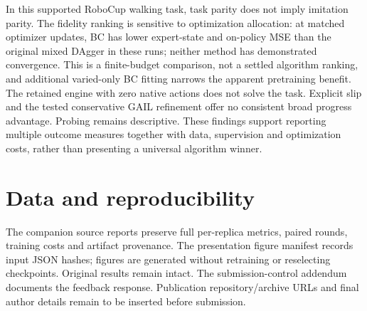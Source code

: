 \documentclass[conference]{IEEEtran}
\begin{document}
In this supported RoboCup walking task, task parity does not imply imitation parity. The fidelity ranking is sensitive to optimization allocation: at matched optimizer updates, BC has lower expert-state and on-policy MSE than the original mixed DAgger in these runs; neither method has demonstrated convergence. This is a finite-budget comparison, not a settled algorithm ranking, and additional varied-only BC fitting narrows the apparent pretraining benefit. The retained engine with zero native actions does not solve the task. Explicit slip and the tested conservative GAIL refinement offer no consistent broad progress advantage. Probing remains descriptive. These findings support reporting multiple outcome measures together with data, supervision and optimization costs, rather than presenting a universal algorithm winner.

\section*{Data and reproducibility}

The companion source reports preserve full per-replica metrics, paired rounds, training costs and artifact provenance. The presentation figure manifest records input JSON hashes; figures are generated without retraining or reselecting checkpoints. Original results remain intact. The submission-control addendum documents the feedback response. Publication repository/archive URLs and final author details remain to be inserted before submission.

\label{bodyend}
\clearpage


\end{document}
